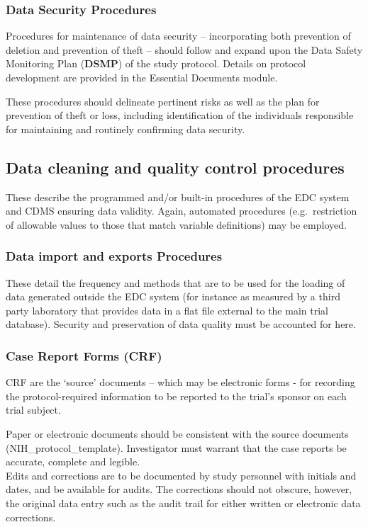 \documentclass[]{book}
\begin{document}
\subsubsection{Data Security Procedures}\label{data-security-procedures}

Procedures for maintenance of data security -- incorporating both
prevention of deletion and prevention of theft -- should follow and
expand upon the Data Safety Monitoring Plan (\textbf{DSMP}) of the study
protocol. Details on protocol development are provided in the Essential
Documents module.

These procedures should delineate pertinent risks as well as the plan
for prevention of theft or loss, including identification of the
individuals responsible for maintaining and routinely confirming data
security.

\subsection{Data cleaning and quality control
procedures}\label{data-cleaning-and-quality-control-procedures}

These describe the programmed and/or built-in procedures of the EDC
system and CDMS ensuring data validity. Again, automated procedures
(e.g.~restriction of allowable values to those that match variable
definitions) may be employed.

\subsubsection{Data import and exports
Procedures}\label{data-import-and-exports-procedures}

These detail the frequency and methods that are to be used for the
loading of data generated outside the EDC system (for instance as
measured by a third party laboratory that provides data in a flat file
external to the main trial database). Security and preservation of data
quality must be accounted for here.

\subsubsection{Case Report Forms (CRF)}\label{case-report-forms-crf}

CRF are the `source' documents -- which may be electronic forms - for
recording the protocol-required information to be reported to the
trial's sponsor on each trial subject.

Paper or electronic documents should be consistent with the source
documents (NIH\_protocol\_template). Investigator must warrant that the
case reports be accurate, complete and legible.\\[2\baselineskip]Edits
and corrections are to be documented by study personnel with initials
and dates, and be available for audits. The corrections should not
obscure, however, the original data entry such as the audit trail for
either written or electronic data corrections.
\end{document}
